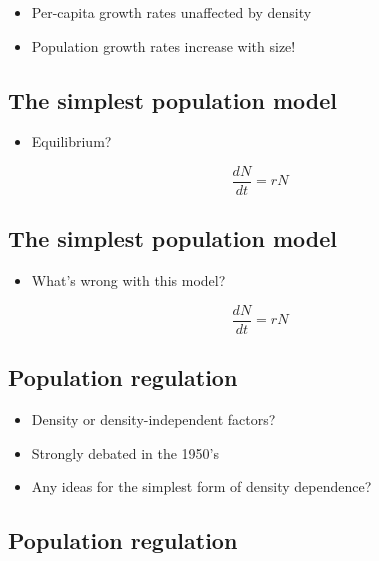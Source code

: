 \documentclass[
  letterpaper,
  DIV=11,
  numbers=noendperiod]{scrartcl}
\providecommand{\tightlist}{%
  \setlength{\itemsep}{0pt}\setlength{\parskip}{0pt}}\usepackage{longtable,booktabs,array}
\begin{document}
\begin{itemize}
\tightlist
\item
  Per-capita growth rates unaffected by density
\item
  Population growth rates increase with size!
\end{itemize}

\hypertarget{the-simplest-population-model-5}{%
\subsection{The simplest population
model}\label{the-simplest-population-model-5}}

\begin{itemize}
\tightlist
\item
  Equilibrium?
\end{itemize}

\[\frac{dN}{dt}=rN\]

\hypertarget{the-simplest-population-model-6}{%
\subsection{The simplest population
model}\label{the-simplest-population-model-6}}

\begin{itemize}
\tightlist
\item
  What's wrong with this model?
\end{itemize}

\[\frac{dN}{dt}=rN\]

\hypertarget{population-regulation}{%
\subsection{Population regulation}\label{population-regulation}}

\begin{itemize}
\item
  Density or density-independent factors?
\item
  Strongly debated in the 1950's
\item
  Any ideas for the simplest form of density dependence?
\end{itemize}

\hypertarget{population-regulation-1}{%
\subsection{Population regulation}\label{population-regulation-1}}
\end{document}
